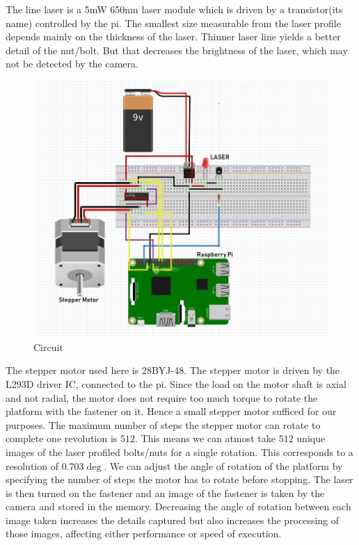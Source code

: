 \documentclass[12pt]{report}
\begin{document}
The line laser is a 5mW 650nm laser module which is driven by a transistor(its name) controlled by the pi. The smallest size measurable from the laser profile depends mainly on the thickness of the laser. Thinner laser line yields a better detail of the nut/bolt. But that decreases the brightness of the laser, which may not be detected by the camera.
\begin{figure}[h]
\centering
\includegraphics[scale=.5]{circuit.jpg}
\caption{Circuit}
\end{figure}
The stepper motor used here is 28BYJ-48. The stepper motor is driven by the L293D driver IC, connected to the pi. Since the load on the motor shaft is axial and not radial, the motor does not require too much torque to rotate the platform with the fastener on it. Hence a small stepper motor sufficed for our purposes. The maximum number of steps the stepper motor can rotate to complete one revolution is $512$. This means we can atmost take $512$ unique images of the laser profiled bolts/nuts for a single rotation. This corresponds to a resolution of $0.703\deg$. We can adjust the angle of rotation of the platform by specifying the number of steps the motor has to rotate before stopping.
The laser is then turned on the fastener and an image of the fastener is taken by the camera and stored in the memory. Decreasing the angle of rotation between each image taken increases the details captured but also increases the processing of those images, affecting either performance or speed of execution.\\
\end{document}

